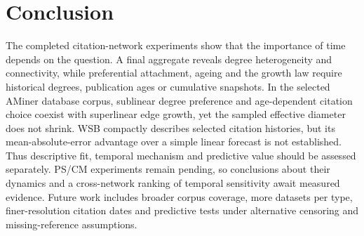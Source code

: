 \section{Conclusion}
\label{sec:conclusion}
The completed citation-network experiments show that the importance of time
depends on the question. A final aggregate reveals degree heterogeneity and
connectivity, while preferential attachment, ageing and the growth law require
historical degrees, publication ages or cumulative snapshots. In the selected
AMiner database corpus, sublinear degree preference and age-dependent citation
choice coexist with superlinear edge growth, yet the sampled effective diameter
does not shrink. WSB compactly describes selected citation histories, but its
mean-absolute-error advantage over a simple linear forecast is not established.
Thus descriptive fit, temporal mechanism and predictive value should be assessed
separately. PS/CM experiments remain pending, so conclusions about their dynamics
and a cross-network ranking of temporal sensitivity await measured evidence.
Future work includes broader corpus coverage, more datasets per type,
finer-resolution citation dates and predictive tests under alternative censoring
and missing-reference assumptions.

